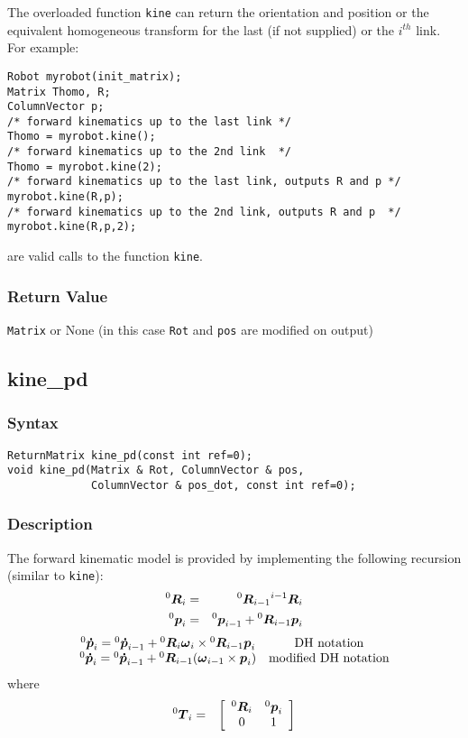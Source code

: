 \documentclass[11pt,fleqn,letterpaper]{report}
\newcommand{\mbold}[1]{\mbox{\boldmath $ #1 $}}
\newcommand{\matr}[2]{\left[\begin{array}{#1} #2 \end{array}\right]}
\begin{document}
The overloaded function {\tt kine} can return the orientation and position or 
the equivalent homogeneous transform for the last (if not supplied) or the $i^{th}$
link. For example: 
\begin{verbatim}
Robot myrobot(init_matrix);
Matrix Thomo, R;
ColumnVector p;
/* forward kinematics up to the last link */
Thomo = myrobot.kine();  
/* forward kinematics up to the 2nd link  */
Thomo = myrobot.kine(2); 
/* forward kinematics up to the last link, outputs R and p */
myrobot.kine(R,p);       
/* forward kinematics up to the 2nd link, outputs R and p  */
myrobot.kine(R,p,2);     
\end{verbatim}
\noindent are valid calls to the function {\tt kine}.


\subsubsection*{Return Value}

{\tt Matrix} or None (in this case {\tt Rot} and {\tt pos} are modified on output)

\newpage

\subsection*{kine\_pd}
\subsubsection*{Syntax}
\begin{verbatim}
ReturnMatrix kine_pd(const int ref=0);
void kine_pd(Matrix & Rot, ColumnVector & pos, 
             ColumnVector & pos_dot, const int ref=0);
\end{verbatim}
\subsubsection*{Description}   
The forward kinematic model is provided by implementing 
the following recursion (similar to \texttt{kine}):
\begin{eqnarray}
{}^0 \mbold{R}_i & = & {}^0 \mbold{R}_{i-1} {}^{i-1}\mbold{R}_i \\
{}^0 \mbold{p}_i & = & {}^0 \mbold{p}_{i-1} + {}^0 \mbold{R}_{i-1}
\mbold{p}_i 
\end{eqnarray}
\begin{eqnarray}
 \begin{array}{cc}
  {}^0 \mbold{\dot{p}}_i = {}^0 \mbold{\dot{p}}_{i-1} + {}^0
  \mbold{R}_i \mbold{\omega}_i \times {}^0 \mbold{R}_{i-1} \mbold{p}_i & \textrm{DH notation} \\
  {}^0 \mbold{\dot{p}}_i = {}^0 \mbold{\dot{p}}_{i-1} + {}^0
  \mbold{R}_{i-1} (\mbold{\omega}_{i-1} \times \mbold{p}_i) & \textrm{modified DH notation}
 \end{array}
\end{eqnarray}
where
\begin{eqnarray}
{}^0 \mbold{T}_i & = & \matr{cc}{
{}^0 \mbold{R}_{i} & {}^0 \mbold{p}_i \\
0 & 1 }
\end{eqnarray}
\end{document}
